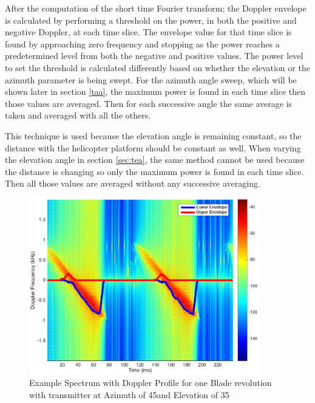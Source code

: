 After the computation of the short time Fourier transform; the Doppler envelope is calculated by performing a threshold on the power, in both the positive and negative Doppler, at each time slice. The envelope value for that time slice is found by approaching zero frequency and stopping as the power reaches a predetermined level from both the negative and positive values. The power level to set the threshold is calculated differently based on whether the elevation or the azimuth parameter is being swept. For the azimuth angle sweep, which will be shown later in section \ref{taa}, the maximum power is found in each time slice then those values are averaged. Then for each successive angle the same average is taken and averaged with all the others. 


This technique is used because the elevation angle is remaining constant, so the distance with the helicopter platform should be constant as well. When varying the elevation angle in section \ref{sec:tea}, the same method cannot be used because the distance is changing so only the maximum power is found in each time slice. Then all those values are averaged without any successive averaging.

\begin{figure}
	\begin{center}
		\includegraphics[width=10cm]{images/simulation/test_analysis_spectrogram_with_envelope.eps}
		\caption{Example Spectrum with Doppler Profile for one Blade revolution with transmitter at Azimuth of 45\textdegree \space and Elevation of 35\textdegree}
		\label{fig:test_spec_w_doppler_profile}
	\end{center}
\end{figure}

